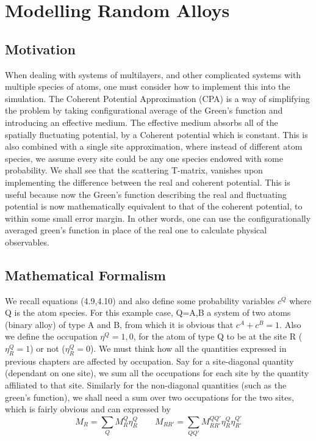 \documentclass[12pt]{article}
\begin{document}
\section{Modelling Random Alloys}
\subsection{Motivation}

When dealing with systems of multilayers, and other complicated systems with multiple species of atoms, one must consider how to implement this into the simulation. The Coherent Potential Approximation (CPA)\cite{turek,drchal} is a way of simplifying the problem by taking configurational average of the Green's function and introducing an effective medium. The effective medium absorbs all of the spatially fluctuating potential, by a Coherent potential which is constant. This is also combined with a single site approximation, where instead of different atom species, we assume every site could be any one species endowed with some probability. We shall see that the scattering T-matrix, vanishes upon implementing the difference between the real and coherent potential. This is useful because now the Green's function describing the real and fluctuating potential is now mathematically equivalent to that of the coherent potential, to within some small error margin. In other words, one can use the configurationally averaged green's function in place of the real one to calculate physical observables.

\subsection{Mathematical Formalism}

We recall equations (4.9,4.10) and also define some probability variables $c^Q$ where Q is the atom species. For this example case, Q=A,B a system of two atoms (binary alloy) of type A and B, from which it is obvious that $c^A+c^B=1$. Also we define the occupation $\eta^Q={1,0}$, for the atom of type Q to be at the site R ($\eta_R^Q=1$) or not ($\eta_R^Q=0$). We must think how all the quantities expressed in previous chapters are affected by occupation. Say for a site-diagonal quantity (dependant on one site), we sum all the occupations for each site by the quantity affiliated to that site. Similarly for the non-diagonal quantities (such as the green's function), we shall need a sum over two occupations for the two sites, which is fairly obvious and can expressed by
$$M_R=\sum_Q M_R^Q \eta_R^Q \qquad M_{RR'}=\sum_{QQ'} M_{RR'}^{QQ'} \eta_R^Q \eta_{R'}^{Q'} $$
\end{document}
